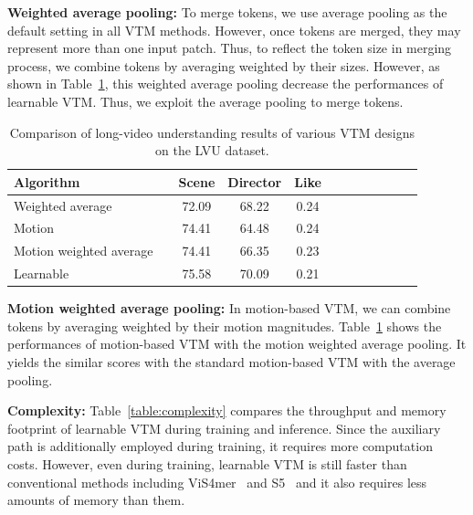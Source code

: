 \documentclass{article}
\begin{document}
\vspace{0.2cm}
\noindent\textbf{Weighted average pooling:} To merge tokens, we use average pooling as the default setting in all VTM methods. However, once tokens are merged, they may represent more than one input patch. Thus, to reflect the token size in merging process, we combine tokens by averaging weighted by their sizes. However, as shown in Table~\ref{table:more_design_choices}, this weighted average pooling decrease the performances of learnable VTM. Thus, we exploit the average pooling to merge tokens.

\begin{table}[t]
\caption
    {
        Comparison of long-video understanding results of various VTM designs on the LVU dataset.
    }
\centering
\footnotesize

    \begin{tabular}{@{} l c c c c c c c c c c c @{} }
        \toprule
        Algorithm && Scene & Director & Like  \\
        \midrule
          Weighted average        && 72.09 & 68.22  & 0.24  \\
          Motion                  && 74.41 & 64.48  & 0.24  \\
          Motion weighted average && 74.41 & 66.35  & 0.23  \\
          Learnable               && 75.58 & 70.09  & 0.21 \\
          
        \bottomrule
    \end{tabular} 
    \label{table:more_design_choices}

\end{table}

\vspace{0.2cm}
\noindent\textbf{Motion weighted average pooling:} In motion-based VTM, we can combine tokens by averaging weighted by their motion magnitudes. Table~\ref{table:more_design_choices} shows the performances of motion-based VTM with the motion weighted average pooling. It yields the similar scores with the standard motion-based VTM with the average pooling. 

\vspace{0.2cm}
\noindent\textbf{Complexity:} Table~\ref{table:complexity} compares the throughput and memory footprint of learnable VTM during training and inference. Since the auxiliary path is additionally employed during training, it requires more computation costs. However, even during training, learnable VTM is still faster than conventional methods including ViS4mer~\citep{islam2022vis4mer} and S5~\citep{wang2023s5} and it also requires less amounts of memory than them. 
\end{document}

